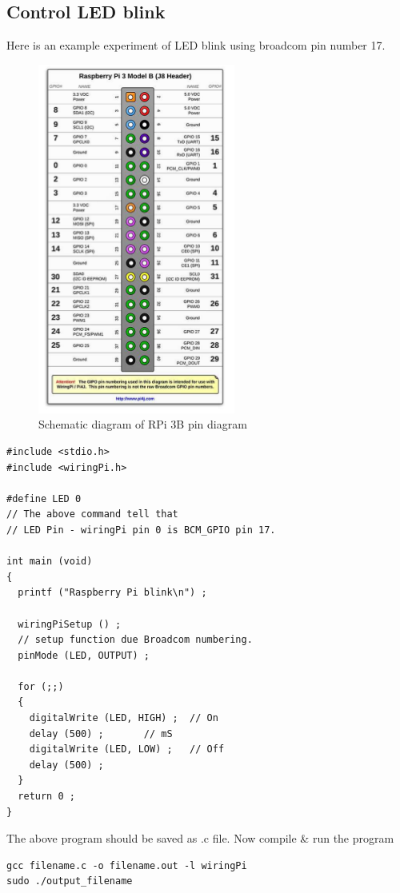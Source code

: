 \documentclass[journal,12pt,twocolumn]{IEEEtran}
\begin{document}
\subsection{Control LED blink}
Here is an example experiment of LED blink using broadcom pin number 17.
\begin{figure}[h!]
\centering
\includegraphics[scale=0.6]{figs/Pindiagram}
\caption{Schematic diagram of RPi 3B pin diagram \cite{b2}}
\end{figure}

\begin{lstlisting}[frame = single]
#include <stdio.h>
#include <wiringPi.h>

#define	LED	0
// The above command tell that 
// LED Pin - wiringPi pin 0 is BCM_GPIO pin 17.

int main (void)
{
  printf ("Raspberry Pi blink\n") ;

  wiringPiSetup () ;
  // setup function due Broadcom numbering.
  pinMode (LED, OUTPUT) ;

  for (;;)
  {
    digitalWrite (LED, HIGH) ;	// On
    delay (500) ;		// mS
    digitalWrite (LED, LOW) ;	// Off
    delay (500) ;
  }
  return 0 ;
}
\end{lstlisting}
The above program should be saved as .c file. Now compile \& run the program 
\begin{lstlisting}[frame= single]
gcc filename.c -o filename.out -l wiringPi
sudo ./output_filename
\end{lstlisting}
\end{document}
